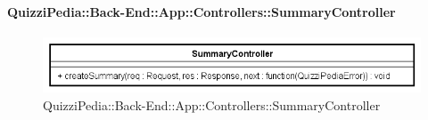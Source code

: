 \paragraph{QuizziPedia::Back-End::App::Controllers::SummaryController}
\label{QuizziPedia::Back-End::App::Controllers::SummaryController}
\begin{figure}[ht]
	\centering
	\includegraphics[scale=0.8]{UML/Classi/Back-End/QuizziPedia_Back-End_App_Controllers_SummaryController.png}
	\caption{QuizziPedia::Back-End::App::Controllers::SummaryController}
\end{figure}
\FloatBarrier

